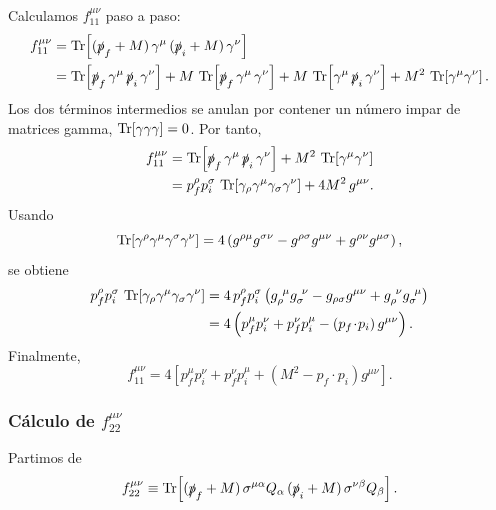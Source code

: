 Calculamos \(f_{11}^{\mu\nu}\) paso a paso:
\begin{align}
f_{11}^{\mu\nu}
&=
\Tr\!\left[(\slashed{p}_f+M)\,\gamma^{\mu}\,(\slashed{p}_i+M)\,\gamma^{\nu}\right]
\nonumber\\
&=
\Tr\!\left[\slashed{p}_f\,\gamma^{\mu}\,\slashed{p}_i\,\gamma^{\nu}\right]
+M\,\Tr\!\left[\slashed{p}_f\,\gamma^{\mu}\,\gamma^{\nu}\right]
+M\,\Tr\!\left[\gamma^{\mu}\,\slashed{p}_i\,\gamma^{\nu}\right]
+M^2\,\Tr\!\left[\gamma^{\mu}\gamma^{\nu}\right].
\label{eq:f11_munu_expand_terms}
\end{align}
Los dos términos intermedios se anulan por contener un número impar de matrices gamma,
\(\Tr[\gamma\gamma\gamma]=0\). Por tanto,
\begin{align}
f_{11}^{\mu\nu}
&=
\Tr\!\left[\slashed{p}_f\,\gamma^{\mu}\,\slashed{p}_i\,\gamma^{\nu}\right]
+M^2\,\Tr\!\left[\gamma^{\mu}\gamma^{\nu}\right]
\nonumber\\
&=
p_f^\rho p_i^\sigma\,\Tr\!\left[\gamma_\rho\gamma^{\mu}\gamma_\sigma\gamma^{\nu}\right]
+4M^2\,g^{\mu\nu}.
\label{eq:f11_munu_reduce_4gamma}
\end{align}
Usando
\begin{equation}
\Tr[\gamma^\rho\gamma^\mu\gamma^\sigma\gamma^\nu]
=
4\left(g^{\rho\mu}g^{\sigma\nu}-g^{\rho\sigma}g^{\mu\nu}+g^{\rho\nu}g^{\mu\sigma}\right),
\end{equation}
se obtiene
\begin{align}
p_f^\rho p_i^\sigma\,\Tr\!\left[\gamma_\rho\gamma^{\mu}\gamma_\sigma\gamma^{\nu}\right]
&=
4\,p_f^\rho p_i^\sigma
\left(g_{\rho}^{\ \mu}g_{\sigma}^{\ \nu}-g_{\rho\sigma}g^{\mu\nu}+g_{\rho}^{\ \nu}g_{\sigma}^{\ \mu}\right)
\nonumber\\
&=
4\left(p_f^{\mu}p_i^{\nu}+p_f^{\nu}p_i^{\mu}-(p_f\!\cdot\!p_i)\,g^{\mu\nu}\right).
\label{eq:f11_munu_trace_eval}
\end{align}
Finalmente,
\begin{equation}
f_{11}^{\mu\nu}
=
4\left[p_f^{\mu}p_i^{\nu}+p_f^{\nu}p_i^{\mu}+\left(M^2-p_f\!\cdot\!p_i\right)g^{\mu\nu}\right].
\label{eq:f11_munu_final}
\end{equation}

\subsubsection*{Cálculo de $f_{22}^{\mu\nu}$ }
\label{app:hadronico:f22_munu_correcto}

Partimos de
\begin{equation}
f_{22}^{\mu\nu}\equiv 
\Tr\!\left[(\slashed{p}_f+M)\,\sigma^{\mu\alpha}Q_\alpha\,(\slashed{p}_i+M)\,\sigma^{\nu\beta}Q_\beta\right].
\label{eq:f22_def_munu}
\end{equation}

